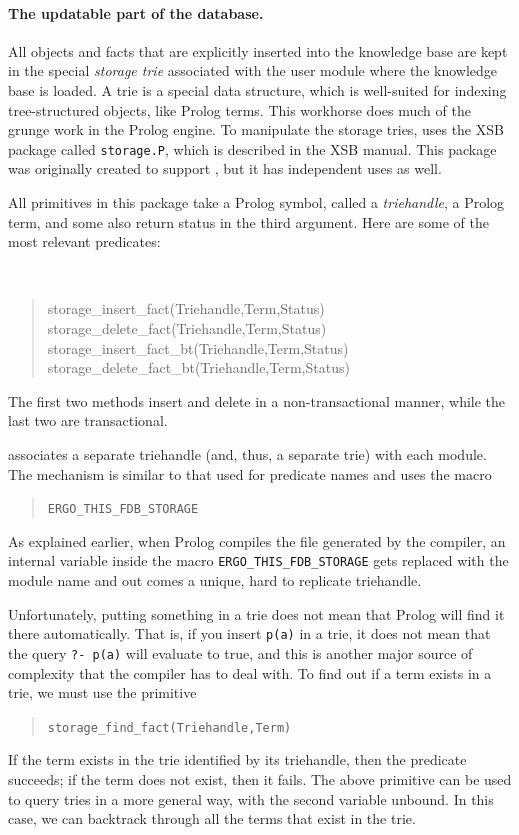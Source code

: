 \documentclass[11pt]{article}
\newcommand{\ERGO}{\mbox{\smaller{\ensuremath{\cal{E}}\smaller{{\sc{RGO}}}}}\xspace}
\newcommand{\FLSYSTEM}{\ERGO}
\begin{document}
\paragraph{The updatable part of the database.}
All objects and facts that are explicitly inserted into the knowledge
base are kept
in the special \emph{storage trie} associated with the user module where the
knowledge base is loaded. A trie is a special data structure, which is
well-suited for indexing tree-structured objects, like Prolog terms. This
workhorse does much of the grunge work in the Prolog engine. To manipulate the
storage tries, \FLSYSTEM uses the XSB package called {\tt storage.P}, which is
described in the XSB manual. This package was originally created to support
\FLSYSTEM, but it has independent uses as well.

All primitives in this package take a Prolog symbol, called a
\emph{triehandle}, a Prolog term, and some also return status in the third
argument. Here are some of the most relevant predicates:
{\tt
\begin{quote}
  storage\_insert\_fact(Triehandle,Term,Status)\\
  storage\_delete\_fact(Triehandle,Term,Status)\\
  storage\_insert\_fact\_bt(Triehandle,Term,Status)\\
  storage\_delete\_fact\_bt(Triehandle,Term,Status)
\end{quote}
}
\noindent
The first two methods insert and delete in a non-transactional manner,
while the last two are transactional.

\FLSYSTEM associates a separate triehandle (and, thus, a separate trie) with
each module. The mechanism is similar to that used for predicate names and
uses the macro
\begin{quote}
 \tt ERGO\_THIS\_FDB\_STORAGE
\end{quote}
As explained earlier, when Prolog compiles the file generated by the
\FLSYSTEM compiler, an internal variable inside
the macro {\tt ERGO\_THIS\_FDB\_STORAGE} gets replaced with
the module name and out comes a unique, hard to replicate triehandle.

Unfortunately, putting something in a trie does not mean that Prolog will find
it there automatically. That is, if you insert {\tt p(a)} in a trie, it
does not mean that the query {\tt ?- p(a)} will evaluate to true, and this
is another major source of complexity that the \FLSYSTEM compiler has to deal
with. To find out if a term exists in a trie, we must use the primitive
\begin{quote}
 \tt storage\_find\_fact(Triehandle,Term)  
\end{quote}
If the term exists in the trie identified by its triehandle, then the
predicate succeeds; if the term does not exist, then it fails. The above
primitive can be used to query tries in a more general way, with the second
variable unbound. In this case, we can backtrack through all the terms that
exist in the trie.
\end{document}
